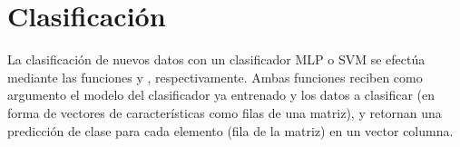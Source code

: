 \section{Clasificación}
La clasificación de nuevos datos con un clasificador MLP o SVM se
efectúa mediante las funciones  y
, respectivamente.  Ambas funciones reciben como
argumento el modelo del clasificador ya entrenado y los datos a
clasificar (en forma de vectores de características como filas de una
matriz), y retornan una predicción de clase para cada elemento (fila
de la matriz) en un vector columna.